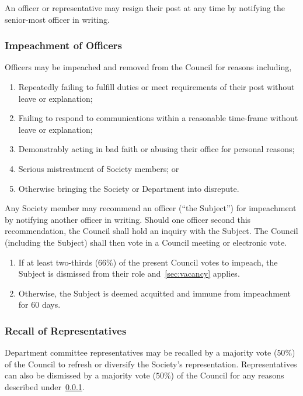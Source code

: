 An officer or representative may resign their post at any time by notifying the
senior-most officer in writing.

\subsubsection{Impeachment of Officers}\label{sec:impeachment}

Officers may be impeached and removed from the Council for reasons including,

\begin{enumerate}
      \item Repeatedly failing to fulfill duties or meet requirements of their post without
            leave or explanation;
      \item Failing to respond to communications within a reasonable time-frame without
            leave or explanation;
      \item Demonstrably acting in bad faith or abusing their office for personal reasons;
      \item Serious mistreatment of Society members; or
      \item Otherwise bringing the Society or Department into disrepute.
\end{enumerate}

Any Society member may recommend an officer (``the Subject'') for impeachment
by notifying another officer in writing. Should one officer second this
recommendation, the Council shall hold an inquiry with the Subject. The Council
(including the Subject) shall then vote in a Council meeting or electronic
vote.

\begin{enumerate}
      \item If at least two-thirds ($66\%$) of the present Council votes to impeach, the
            Subject is dismissed from their role and~\ref{sec:vacancy} applies.
      \item Otherwise, the Subject is deemed acquitted and immune from impeachment for 60
            days.
\end{enumerate}

\subsubsection{Recall of Representatives}\label{sec:recall}

Department committee representatives may be recalled by a majority vote
($50\%$) of the Council to refresh or diversify the Society's representation.
Representatives can also be dismissed by a majority vote ($50\%$) of the
Council for any reasons described under~\ref{sec:impeachment}.

